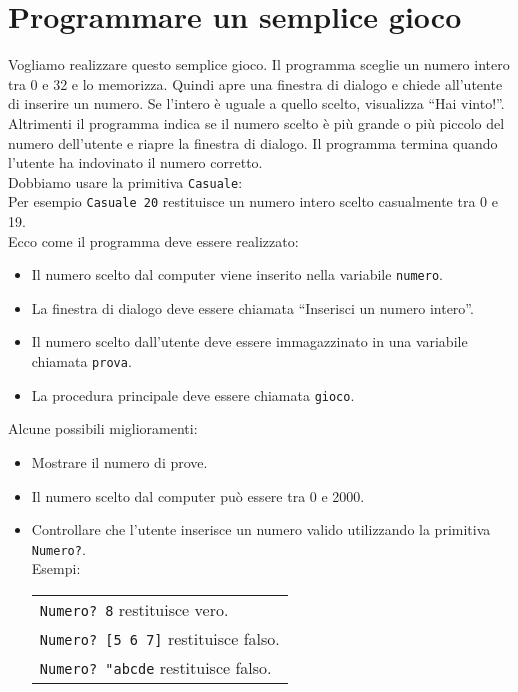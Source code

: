 \section{Programmare un semplice gioco}
Vogliamo realizzare questo semplice gioco. Il programma sceglie un numero intero tra 0 e 32 e lo memorizza. Quindi apre una finestra di dialogo e chiede all'utente di inserire un numero. Se l'intero è uguale a quello scelto, visualizza ``Hai vinto!''. Altrimenti il programma indica se il numero scelto è più grande o più piccolo del numero dell'utente e riapre la finestra di dialogo. Il programma termina quando l'utente ha indovinato il numero corretto.\\
Dobbiamo usare la primitiva  \texttt{Casuale}:\\
Per esempio \texttt{Casuale 20} restituisce un numero intero scelto casualmente tra 0 e 19.\\

Ecco come il programma deve essere realizzato:
\begin{itemize}
	\item Il numero scelto dal computer viene inserito nella variabile \texttt{numero}.
	\item La finestra di dialogo deve essere chiamata ``Inserisci un numero intero''.
	\item Il numero scelto dall'utente deve essere immagazzinato in una variabile chiamata \texttt{prova}.
	\item La procedura principale deve essere chiamata \texttt{gioco}.
\end{itemize}
\vspace{0.5cm}


Alcune possibili miglioramenti:\\
\begin{itemize}
	\item Mostrare il numero di prove.
	\item Il numero scelto dal computer può essere tra 0 e 2000.
	\item Controllare che l'utente inserisce un numero valido utilizzando la primitiva \texttt{Numero?}. \\
	Esempi: 
	\begin{tabular}[t]{l}
		\texttt{Numero? 8} restituisce vero.\\
		\texttt{Numero? [5 6 7]} restituisce falso. \\
		\texttt{Numero? "abcde} restituisce falso. 
	\end{tabular}
\end{itemize}